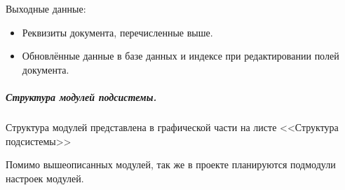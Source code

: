 Выходные данные:
\begin{itemize}
\item Реквизиты документа, перечисленные выше.
\item Обновлённые данные в базе данных и индексе при редактировании полей документа.
\end{itemize}


\subparagraph{Структура модулей подсистемы.} \hfill

Структура модулей представлена в графической части на листе <<Структура подсистемы>>

Помимо вышеописанных модулей, так же в проекте планируются подмодули настроек модулей.


